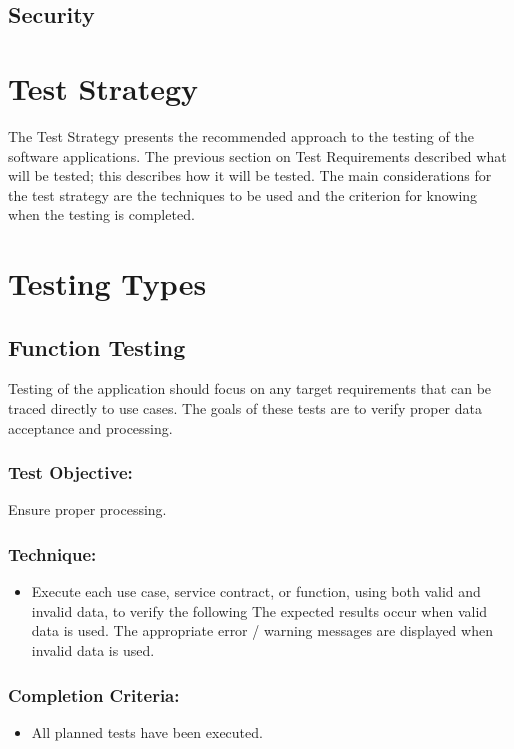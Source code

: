 \documentclass[a4paper,12pt]{report}
\begin{document}
	\subsection {Security}
	
\section {Test Strategy}
	The Test Strategy presents the recommended approach to the testing of the software applications. The previous section on Test Requirements described what will be tested; this describes how it will be tested.
	The main considerations for the test strategy are the techniques to be used and the criterion for knowing when the testing is completed.
	
	\section {Testing Types}
		\subsection {Function Testing}
			Testing of the application should focus on any target requirements that can be traced directly to use cases. 
			The goals of these tests are to verify proper data acceptance and processing.
			\subsubsection {Test Objective:}
				Ensure proper processing.
			\subsubsection {Technique:}
				\begin {itemize}
					\item Execute each use case, service contract, or function, using both valid and invalid data, to verify the following
						\subitem The expected results occur when valid data is used.
						\subitem The appropriate error / warning messages are displayed when invalid data is used.
				\end {itemize}
			\subsubsection {Completion Criteria:}
				\begin {itemize}
					\item All planned tests have been executed.
				\end {itemize}
				
\end{document}
